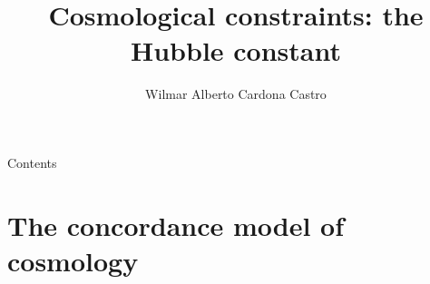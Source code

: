 \documentclass{beamer}
\author[Wilmar Alberto Cardona Castro]{Wilmar Alberto Cardona Castro}
\title[Cosmological constraints: the Hubble constant]{Cosmological constraints: the Hubble constant}
\begin{document}


\begin{frame}
  \titlepage
\end{frame}

\begin{frame}{Contents}
  \tableofcontents
\end{frame}

\section{The concordance model of cosmology}
\end{document}
